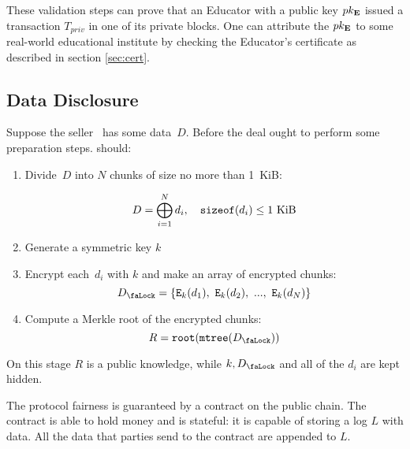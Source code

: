 These validation steps can prove that an Educator with a public key $pk_{\mathbf{E}}$ issued a transaction $T_{priv}$ in one of its private blocks. One can attribute the $pk_{\mathbf{E}}$ to some real-world educational institute by checking the Educator's certificate as described in section \ref{sec:cert}.

\subsection{Data Disclosure}
\label{sec:DataDisclosure}

Suppose the seller~ has some data~$D$. Before the deal  ought to perform some preparation steps.  should:
\begin{enumerate}
\item Divide~$D$ into $N$ chunks of size no more than 1~KiB:

\begin{equation}
D = \bigoplus_{i=1}^N d_i, \quad \mathtt{sizeof}(d_i) \leq 1~\mathrm{KiB}
\end{equation}

\item Generate a symmetric key $k$
\item Encrypt each~$d_i$ with $k$ and make an array of encrypted chunks:
\begin{equation}
\Lock = \{ \Encrypt_\Key{k}(d_1),\ \Encrypt_\Key{k}(d_2),\ ...,\ \Encrypt_\Key{k}(d_N) \}
\end{equation}

\item Compute a Merkle root of the encrypted chunks:
\begin{equation}
R = \Root(\MerkleTree(\Lock))
\end{equation}

\end{enumerate}

On this stage $R$ is a public knowledge, while $k, \Lock$ and all of the $d_i$ are kept hidden.

The protocol fairness is guaranteed by a contract on the public chain. The contract is able to hold money and is stateful: it is capable of storing a log $L$ with data. All the data that parties send to the contract are appended to $L$.

